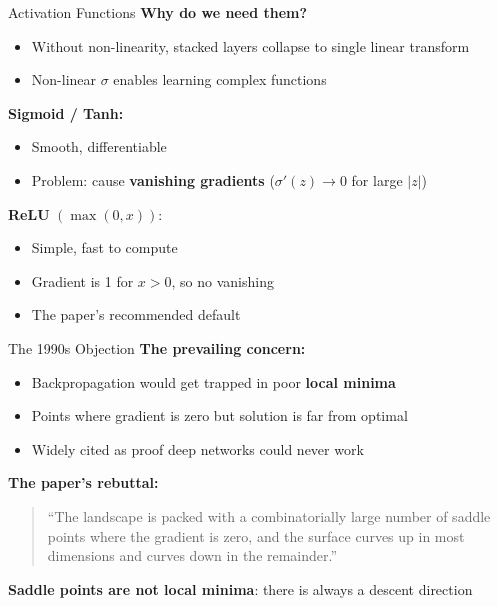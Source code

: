 \begin{frame}{Activation Functions}
    \textbf{Why do we need them?}
    \begin{itemize}
        \item Without non-linearity, stacked layers collapse to single linear transform
        \item Non-linear $\sigma$ enables learning complex functions
    \end{itemize}
    
    \vspace{1em}
    \textbf{Sigmoid / Tanh:}
    \begin{itemize}
        \item Smooth, differentiable
        \item Problem: cause \textbf{vanishing gradients} ($\sigma'(z) \to 0$ for large $|z|$)
    \end{itemize}
    
    \vspace{0.5em}
    \textbf{ReLU} $(\max(0, x))$:
    \begin{itemize}
        \item Simple, fast to compute
        \item Gradient is 1 for $x > 0$, so no vanishing
        \item The paper's recommended default
    \end{itemize}
\end{frame}


\begin{frame}{The 1990s Objection}
    \textbf{The prevailing concern:}
    \begin{itemize}
        \item Backpropagation would get trapped in poor \textbf{local minima}
        \item Points where gradient is zero but solution is far from optimal
        \item Widely cited as proof deep networks could never work
    \end{itemize}
    
    \vspace{1em}
    \textbf{The paper's rebuttal:}
    \begin{quote}
        \small``The landscape is packed with a combinatorially large number of saddle points where the gradient is zero, and the surface curves up in most dimensions and curves down in the remainder.''
    \end{quote}
    
    \vspace{0.5em}
    \textbf{Saddle points are not local minima}: there is always a descent direction
\end{frame}

